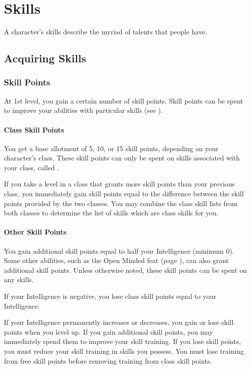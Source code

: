 \chapter{Skills}

A character's skills describe the myriad of talents that people have.

\section{Acquiring Skills}

\subsection{Skill Points}

At 1st level, you gain a certain number of skill points. Skill points can be spent to improve your abilities with particular skills (see ).

\subsubsection{Class Skill Points}

You get a base allotment of 5, 10, or 15 skill points, depending on your character's class. These skill points can only be spent on skills associated with your class, called .

 If you take a level in a class that grants more skill points than your previous class, you immediately gain skill points equal to the difference between the skill points provided by the two classes. You may combine the class skill lists from both classes to determine the list of skills which are class skills for you.

\subsubsection{Other Skill Points}

You gain additional skill points equal to half your Intelligence (minimum 0).  Some other abilities, such as the Open Minded feat (page ), can also grant additional skill points. Unless otherwise noted, these skill points can be spent on any skills.

 If your Intelligence is negative, you lose class skill points equal to your Intelligence.

 If your Intelligence permanently increases or decreases, you gain or lose skill points when you level up. If you gain additional skill points, you may immediately spend them to improve your skill training. If you lose skill points, you must reduce your skill training in skills you possess. You must lose training from free skill points before removing training from class skill points.

